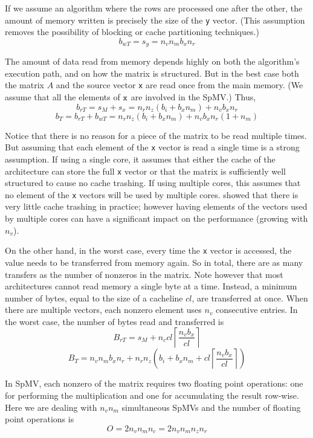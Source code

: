 \documentclass{sig-alternate}
\newcommand{\ceil}[1]{\left\lceil#1\right\rceil}
\begin{document}
If we assume an algorithm where the rows are processed one after
the other, the amount of memory written is precisely the
size of the {\tt y} vector. (This assumption removes the possibility of
blocking or cache partitioning techniques.) $$b_{wT} = s_y = n_v n_m b_x n_r$$

The amount of data read from memory depends highly on both the
algorithm's execution path, and on how the matrix is structured. But
in the best case both the matrix $A$ and the source vector {\tt x} are
read once from the main memory. (We assume that all the elements of
$\tt x$ are involved in the SpMV.)  Thus, $$b_{rT} = s_M + s_x = n_r
n_z (b_i + b_x n_m) + n_v b_x n_r$$
 $$b_T = b_{rT} + b_{wT} =  n_r n_z (b_i + b_x n_m) + n_v b_x n_r (1 + n_m)$$

Notice that there is no reason for a piece of the matrix to be read
multiple times. But assuming that each element of the {\tt x} vector
is read a single time is a strong assumption. If using a single core,
it assumes that either the cache of the architecture can store the full
{\tt x} vector or that the matrix is sufficiently well structured 
to cause no cache trashing. If using multiple cores, this assumes that
no element of the {\tt x} vectors will be used by multiple
cores. \cite{Saule13-ARXIV} showed that there is very little cache trashing
in practice; however having elements of the vectors used by
multiple cores can have a significant impact on the performance
(growing with $n_v$).

On the other hand, in the worst case, every time the {\tt x} vector is
accessed, the value needs to be transferred from memory again. So in
total, there are as many transfers as the number of nonzeros in the
matrix. Note however that most architectures cannot read memory a
single byte at a time. Instead, a minimum number of bytes, equal to
the size of a cacheline $cl$, are transferred at once.  When there are
multiple vectors, each nonzero element uses $n_v$ consecutive
entries. In the worst case, the number of bytes read and transferred is
$$B_{rT} = s_M + n_c cl \ceil{\frac{n_vb_x}{cl}} $$ 
$$B_T = n_v n_m b_x n_r + n_r n_z \left ( b_i + b_x n_m +  cl \ceil{\frac{n_vb_x}{cl}} \right)$$

In SpMV, each nonzero of the matrix requires two floating point
operations: one for performing the multiplication and one for
accumulating the result row-wise. Here we are dealing with $n_v n_m$
simultaneous SpMVs and the number of floating point operations is
$$O = 2 n_v n_m n_c = 2 n_v n_m n_z n_r$$
\end{document}
